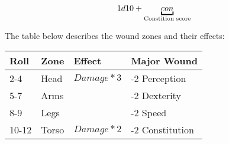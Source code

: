 \[
1d10 + \ub{con}{Constition score}
\]

The table below describes the wound zones and their effects:

\begin{center}
  \begin{tabular}{|l|l|l|l|}
    \hline
    Roll  & Zone  & Effect           & Major Wound     \\ \hline
    2-4   & Head  & \( Damage * 3 \) & -2 Perception   \\ \hline
    5-7   & Arms  &                  & -2 Dexterity    \\ \hline
    8-9   & Legs  &                  & -2 Speed        \\ \hline
    10-12 & Torso & \(Damage * 2 \)  & -2 Constitution \\
    \hline
  \end{tabular}
\end{center}
